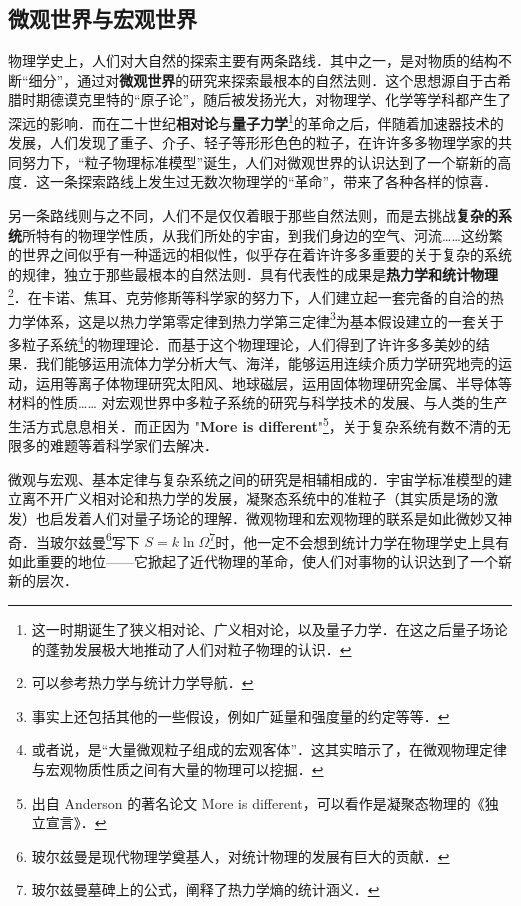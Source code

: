 \subsection{微观世界与宏观世界}
物理学史上，人们对大自然的探索主要有两条路线．其中之一，是对物质的结构不断“细分”，通过对\textbf{微观世界}的研究来探索最根本的自然法则．这个思想源自于古希腊时期德谟克里特的“原子论”，随后被发扬光大，对物理学、化学等学科都产生了深远的影响．而在二十世纪\textbf{相对论}与\textbf{量子力学}\footnote{这一时期诞生了狭义相对论、广义相对论，以及量子力学．在这之后量子场论的蓬勃发展极大地推动了人们对粒子物理的认识．}的革命之后，伴随着加速器技术的发展，人们发现了重子、介子、轻子等形形色色的粒子，在许许多多物理学家的共同努力下，“粒子物理标准模型”诞生，人们对微观世界的认识达到了一个崭新的高度．这一条探索路线上发生过无数次物理学的“革命”，带来了各种各样的惊喜．

另一条路线则与之不同，人们不是仅仅着眼于那些自然法则，而是去挑战\textbf{复杂的系统}所特有的物理学性质，从我们所处的宇宙，到我们身边的空气、河流……这纷繁的世界之间似乎有一种遥远的相似性，似乎存在着许许多多重要的关于复杂的系统的规律，独立于那些最根本的自然法则．具有代表性的成果是\textbf{热力学和统计物理}\footnote{可以参考热力学与统计力学导航．}．在卡诺、焦耳、克劳修斯等科学家的努力下，人们建立起一套完备的自洽的热力学体系，这是以热力学第零定律到热力学第三定律\footnote{事实上还包括其他的一些假设，例如广延量和强度量的约定等等．}为基本假设建立的一套关于多粒子系统\footnote{或者说，是“大量微观粒子组成的宏观客体”．这其实暗示了，在微观物理定律与宏观物质性质之间有大量的物理可以挖掘．}的物理理论．而基于这个物理理论，人们得到了许许多多美妙的结果．我们能够运用流体力学分析大气、海洋，能够运用连续介质力学研究地壳的运动，运用等离子体物理研究太阳风、地球磁层，运用固体物理研究金属、半导体等材料的性质…… 对宏观世界中多粒子系统的研究与科学技术的发展、与人类的生产生活方式息息相关．而正因为 "\textbf{More is different}"\footnote{出自 Anderson 的著名论文 More is different，可以看作是凝聚态物理的《独立宣言》．}，关于复杂系统有数不清的无限多的难题等着科学家们去解决．

微观与宏观、基本定律与复杂系统之间的研究是相辅相成的．宇宙学标准模型的建立离不开广义相对论和热力学的发展，凝聚态系统中的准粒子（其实质是场的激发）也启发着人们对量子场论的理解．微观物理和宏观物理的联系是如此微妙又神奇．当玻尔兹曼\footnote{玻尔兹曼是现代物理学奠基人，对统计物理的发展有巨大的贡献．}写下 $S=k\ln \Omega$\footnote{玻尔兹曼墓碑上的公式，阐释了热力学熵的统计涵义．}时，他一定不会想到统计力学在物理学史上具有如此重要的地位——它掀起了近代物理的革命，使人们对事物的认识达到了一个崭新的层次．
